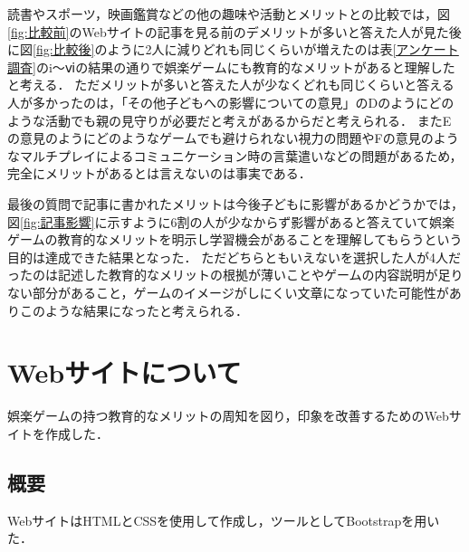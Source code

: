 \documentclass[12pt,a4j,titlepage]{ltjsarticle}
\begin{document}
読書やスポーツ，映画鑑賞などの他の趣味や活動とメリットとの比較では，図\ref{fig:比較前}のWebサイトの記事を見る前のデメリットが多いと答えた人が見た後に図\ref{fig:比較後}のように2人に減りどれも同じくらいが増えたのは表\ref{アンケート調査}のi～ⅵの結果の通りで娯楽ゲームにも教育的なメリットがあると理解したと考える．
ただメリットが多いと答えた人が少なくどれも同じくらいと答える人が多かったのは，「その他子どもへの影響についての意見」のDのようにどのような活動でも親の見守りが必要だと考えがあるからだと考えられる．
またEの意見のようにどのようなゲームでも避けられない視力の問題やFの意見のようなマルチプレイによるコミュニケーション時の言葉遣いなどの問題があるため，完全にメリットがあるとは言えないのは事実である．

最後の質問で記事に書かれたメリットは今後子どもに影響があるかどうかでは，図\ref{fig:記事影響}に示すように6割の人が少なからず影響があると答えていて娯楽ゲームの教育的なメリットを明示し学習機会があることを理解してもらうという目的は達成できた結果となった．
ただどちらともいえないを選択した人が4人だったのは記述した教育的なメリットの根拠が薄いことやゲームの内容説明が足りない部分があること，ゲームのイメージがしにくい文章になっていた可能性がありこのような結果になったと考えられる．



\clearpage
\section{Webサイトについて}\label{Webサイトについて}
娯楽ゲームの持つ教育的なメリットの周知を図り，印象を改善するためのWebサイトを作成した．

\subsection{概要}
WebサイトはHTMLとCSSを使用して作成し，ツールとしてBootstrapを用いた．
\end{document}
